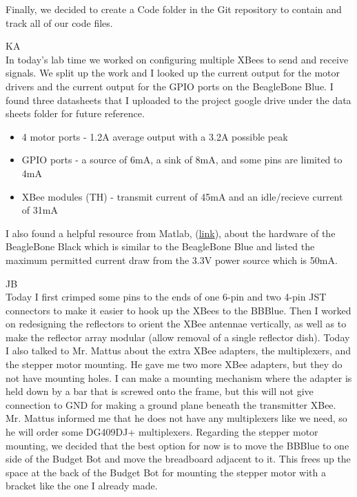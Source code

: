\documentclass[fontsize=11pt, %
                             paper=letter, %
                             openany, %
                             captions=tableheading,
                             index=totoc,
                             hyperref]{labbook}
\begin{document}
\begin{addmargin}[0cm]{0cm}
Finally, we decided to create a Code folder in the Git repository to contain and track all of our code files.

KA\\
In today's lab time we worked on configuring multiple XBees to send and receive signals. We split up the work and I looked up the current output for the motor drivers and the current output for the GPIO ports on the BeagleBone Blue. I found three datasheets that I uploaded to the project google drive under the data sheets folder for future reference.

\begin{itemize}
    \item 4 motor ports - 1.2A average output with a 3.2A possible peak
    \item GPIO ports - a source of 6mA, a sink of 8mA, and some pins are limited to 4mA
    \item XBee modules (TH) - transmit current of 45mA and an idle/recieve current of 31mA
\end{itemize}

I also found a helpful resource from Matlab, (\href{https://www.mathworks.com/help/supportpkg/beagleboneio/examples/working-with-beaglebone-black-hardware.html}{link}), about the hardware of the BeagleBone Black which is similar to the BeagleBone Blue and listed the maximum permitted current draw from the 3.3V power source which is 50mA.\vspace{12pt}

JB\\
Today I first crimped some pins to the ends of one 6-pin and two 4-pin JST connectors to make it easier to hook up the XBees to the BBBlue. Then I worked on redesigning the reflectors to orient the XBee antennae vertically, as well as to make the reflector array modular (allow removal of a single reflector dish). Today I also talked to Mr. Mattus about the extra XBee adapters, the multiplexers, and the stepper motor mounting. He gave me two more XBee adapters, but they do not have mounting holes. I can make a mounting mechanism where the adapter is held down by a bar that is screwed onto the frame, but this will not give connection to GND for making a ground plane beneath the transmitter XBee. Mr. Mattus informed me that he does not have any multiplexers like we need, so he will order some DG409DJ+ multiplexers. Regarding the stepper motor mounting, we decided that the best option for now is to move the BBBlue to one side of the Budget Bot and move the breadboard adjacent to it. This frees up the space at the back of the Budget Bot for mounting the stepper motor with a bracket like the one I already made.



\end{addmargin}
\end{document}
